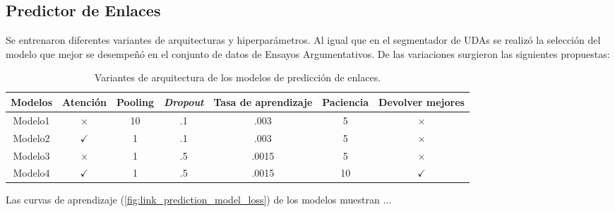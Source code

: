 \subsection{Predictor de Enlaces}

Se entrenaron diferentes variantes de arquitecturas y hiperparámetros. Al igual que en el segmentador de
UDAs se realizó la selección del modelo que mejor se desempeñó en el conjunto de datos de Ensayos Argumentativos.
De las variaciones surgieron las siguientes propuestas:

\begin{table}[h!]
	\begin{center}
		\begin{tabular}{|c|c|c|c|c|c|c|} \hline
		Modelos  & Atención      & Pooling  & \emph{Dropout}   & Tasa de aprendizaje & Paciencia & Devolver mejores     \\ \hline
		Modelo1	 & $\times$	     & 10       & .1               & .003                & 5	      & $\times$            \\ \hline
		Modelo2	 & $\checkmark$	 &  1       & .1               & .003                & 5	      & $\times$            \\ \hline
		Modelo3	 & $\times$	     &  1       & .5               & .0015               & 5	      & $\times$            \\ \hline
		Modelo4	 & $\checkmark$	 &  1       & .5               & .0015               & 10	      & $\checkmark$        \\ \hline
		\end{tabular}
	\caption{Variantes de arquitectura de los modelos de predicción de enlaces.}\label{fig:link_predictor_architecture_table}
	\end{center}
\end{table}

Las curvas de aprendizaje (\ref{fig:link_prediction_model_loss}) de los modelos muestran ...

